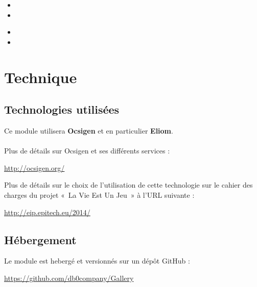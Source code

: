 \documentclass{life-fr}
\begin{document}
\begin{itemize}
  \item {}
  \item {}
\end{itemize}
\begin{itemize}
  \item {}
  \item {}
\end{itemize}


\chapter{Technique}

\section{Technologies utilisées}

Ce module utilisera \textbf{Ocsigen} et en particulier \textbf{Eliom}.\\
\\
Plus de détails sur Ocsigen et ses différents services :
\begin{center}
  \url{http://ocsigen.org/}
\end{center}

Plus de détails sur le choix de l'utilisation de cette technologie sur
le cahier des charges du projet «~La Vie Est Un Jeu~» à l'URL suivante :\\
\begin{center}
  \url{http://eip.epitech.eu/2014/}
\end{center}

\section{Hébergement}

Le module est hebergé et versionnés sur un dépôt GitHub :

\begin{center}
  \url{https://github.com/db0company/Gallery}
\end{center}
\end{document}
